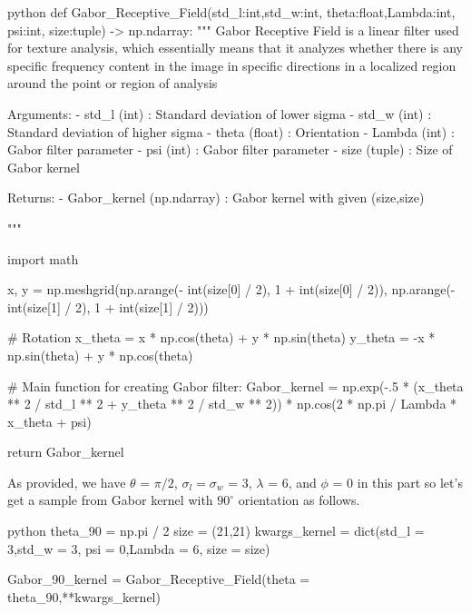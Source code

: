 \documentclass[12pt]{amsart}
\begin{document}
\begin{mintedbox}{python}
def Gabor_Receptive_Field(std_l:int,std_w:int,
                          theta:float,Lambda:int,
                          psi:int, size:tuple) -> np.ndarray:
    """
        Gabor Receptive Field is a linear filter used for texture analysis, which essentially            means that it analyzes whether there is any specific frequency content in the image in           specific directions in a localized region around the point or region of analysis
        
            Arguments:
                - std_l  (int)   : Standard deviation of lower sigma
                - std_w  (int)   : Standard deviation of higher sigma                
                - theta  (float) : Orientation
                - Lambda (int)   : Gabor filter parameter 
                - psi    (int)   : Gabor filter parameter
                - size   (tuple) : Size of Gabor kernel

            Returns:
               - Gabor_kernel (np.ndarray) : Gabor kernel with given (size,size)

    """


    import math

    x, y = np.meshgrid(np.arange(- int(size[0] / 2), 1 + int(size[0] / 2)),
                       np.arange(- int(size[1] / 2), 1 + int(size[1] / 2)))


    # Rotation
    x_theta = x * np.cos(theta) + y * np.sin(theta)
    y_theta = -x * np.sin(theta) + y * np.cos(theta)

    # Main function for creating Gabor filter:
    Gabor_kernel = np.exp(-.5 * (x_theta ** 2 / std_l ** 2 + y_theta ** 2 / std_w ** 2)) * np.cos(2 * np.pi / Lambda * x_theta + psi)


    return Gabor_kernel
\end{mintedbox}

As provided, we have $\theta$ = $\pi/2$, $\sigma_l = \sigma_w$ = 3, $\lambda$ = 6, and $\phi$ = 0 in this part so let's get a sample from Gabor kernel with $90^{\circ}$ orientation as follows.

\begin{mintedbox}{python}
theta_90 = np.pi / 2
size = (21,21)
kwargs_kernel = dict(std_l = 3,std_w = 3,
                     psi = 0,Lambda = 6,
                     size = size)

Gabor_90_kernel = Gabor_Receptive_Field(theta = theta_90,**kwargs_kernel)
\end{mintedbox}
\end{document}
